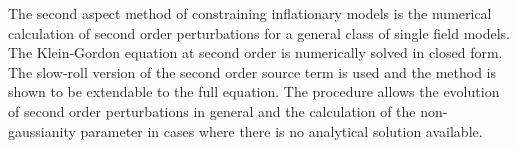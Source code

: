 The second aspect method of constraining inflationary models is the numerical calculation
of second order perturbations for a general class of single field models.
The Klein-Gordon equation at second
order is numerically solved in closed form. 
The slow-roll
version of the second order source term is used and the method is
shown to be extendable to the full equation.
The procedure allows the evolution of second order
perturbations in general and the calculation of the non-gaussianity parameter in cases
where there is no analytical solution available. 
